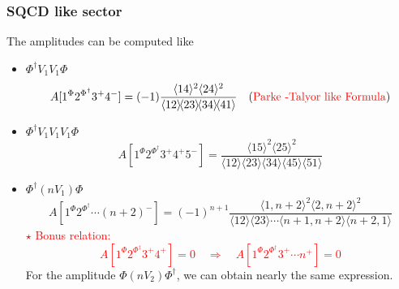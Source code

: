 \documentclass{beamer}
\newcommand{\avg}[1]{\langle #1 \rangle}
\newcommand{\mdavg}[2]{\langle #1 \rangle\!\langle #2 \rangle}
\begin{document}
\begin{frame}
    \frametitle{SQCD like sector}
    The amplitudes can be computed like 
    \begin{itemize}
        \item $\Phi^\dagger V_1V_1\Phi$
        \begin{align*}
            A[1^\Phi2^{\Phi^\dagger}3^+4^-]=(-1)\frac{\avg{14}^2\avg{24}^2}{\mdavg{12}{23}\!\mdavg{34}{41}}\quad (\textcolor{red}{\text{Parke -Talyor like Formula}})
        \end{align*}
        \item $\Phi^\dagger V_1V_1V_1\Phi$
            \begin{equation*}
                A[1^\Phi2^{\Phi^\dagger}3^+4^+5^-]=\frac{\avg{15}^2\!\avg{25}^2}{\mdavg{12}{23}\!\mdavg{34}{45}\!\avg{51}}
            \end{equation*}
    \end{itemize}
\end{frame}

\begin{frame}
    \begin{itemize}
        \item $\Phi^\dagger (nV_1)\Phi$
            \begin{equation*}
                A[1^\Phi2^{\Phi^\dagger}\cdots(n+2)^-]=(-1)^{n+1}\frac{\avg{1,n+2}^2\avg{2,n+2}^2}{\mdavg{12}{23}\cdots\mdavg{n+1,n+2}{n+2,1}}
            \end{equation*}
            \textcolor{red}{$\star$ Bonus relation: \begin{equation*}
                A[1^\Phi2^{\Phi^\dagger}3^+4^+]=0\quad \Rightarrow  \quad A[1^\Phi2^{\Phi^\dagger}3^+\cdots n^+]=0 \end{equation*}}
        For the amplitude $\Phi (nV_2)\Phi^\dagger$, we can obtain nearly the same expression.
    \end{itemize}
\end{frame}
\end{document}
